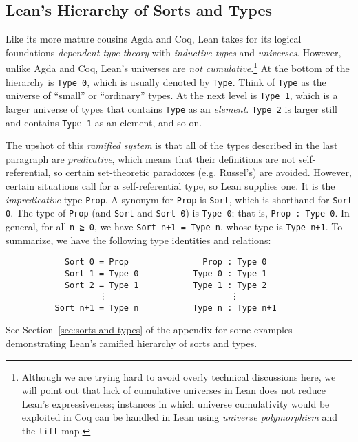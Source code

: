 \documentclass[11pt]{amsart}  %
\begin{document}
\subsection{Lean's Hierarchy of Sorts and Types}
\label{sec:leans-hierarchy-of-sorts-and-types}
Like its more mature cousins Agda and Coq, Lean takes for its logical foundations \emph{dependent type theory} with \emph{inductive types} and \emph{universes}. However, unlike Agda and Coq, Lean's universes are \emph{not cumulative}.\footnote{Although we are trying hard to avoid overly technical discussions here, we will point out that lack of cumulative universes in Lean does not reduce Lean's expressiveness; instances in which universe cumulativity would be exploited in Coq can be handled in Lean using \emph{universe polymorphism} and the \lstinline{lift} map.}
At the bottom of the hierarchy is \lstinline{Type 0}, which is usually denoted by \lstinline{Type}.
Think of  \lstinline{Type} as the universe of ``small'' or ``ordinary'' types.  At the next level is \lstinline{Type 1}, which is a larger universe of types that contains \lstinline{Type} as an \emph{element}. \lstinline{Type 2} is  larger still and contains  \lstinline{Type 1} as an element, and so on. 

The upshot of this \emph{ramified system} is that all of the types described in the last paragraph are \emph{predicative}, which means that their definitions are not self-referential, so certain set-theoretic paradoxes (e.g. Russel's) are avoided. However, certain situations call for a self-referential type, so Lean supplies one. It is the \emph{impredicative} type \lstinline{Prop}.
A synonym for \lstinline{Prop} is \lstinline{Sort}, which is shorthand for \lstinline{Sort 0}. The type of \lstinline{Prop} (and \lstinline{Sort} and  \lstinline{Sort 0}) is \lstinline{Type 0}; that is, \lstinline{Prop : Type 0}. In general, for all \lstinline{n ≧ 0}, 
we have 
\lstinline{Sort n+1 = Type n}, whose type is \lstinline{Type n+1}. 
To summarize, we have the following type identities and relations:
\begin{lstlisting}
            Sort 0 = Prop               Prop : Type 0
            Sort 1 = Type 0           Type 0 : Type 1
            Sort 2 = Type 1           Type 1 : Type 2
                   ⋮                         ⋮
          Sort n+1 = Type n           Type n : Type n+1
\end{lstlisting}
See Section~\ref{sec:sorts-and-types} of the appendix for some examples 
demonstrating Lean's ramified hierarchy of sorts and types.
\end{document}
